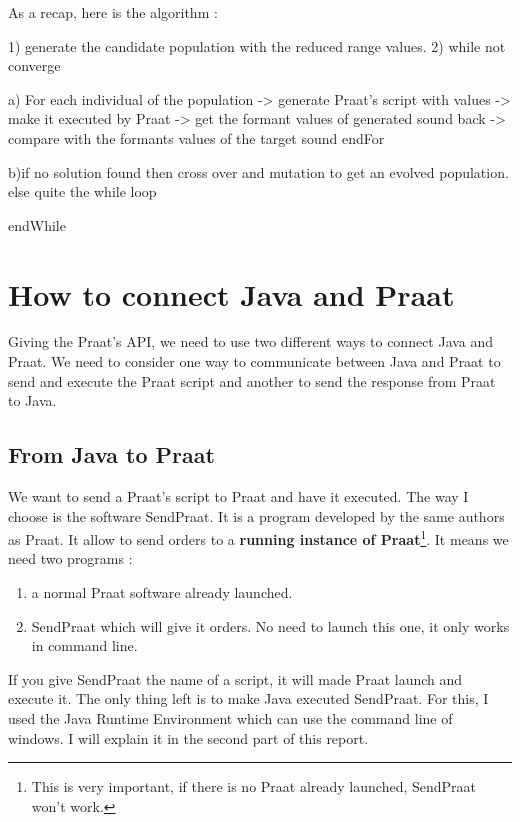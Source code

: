 \documentclass[12pt]{report}
\begin{document}
As a recap, here is the algorithm :


\begin{verbatimtab}[3]
1) generate the candidate population with the reduced range values.
2) while not converge{
		a) For each individual of the population{
					-> generate Praat's script with values 
					-> make it executed by Praat
					-> get the formant values of generated sound back
					-> compare with the formants values of the target sound	   
		   }endFor
		   
		b)if no solution found then{ 
				cross over and mutation to get an evolved population.
			}else{
				 quite the while loop  	 
			}   
		
   }endWhile

\end{verbatimtab}

\chapter{How to connect Java and Praat}
Giving the Praat's API, we need to use two different ways to connect Java and Praat.
We need to consider one way to communicate between Java and Praat to send and execute the Praat script and another to send the response from Praat to Java.

\section{From Java to Praat}
We want to send a Praat's script to Praat and have it executed. The way I choose is the software SendPraat\cite{ref}. It is a program developed by the same authors as Praat. It allow to send orders to a {\bfseries running instance of Praat}\footnote{This is very important, if there is no Praat already launched, SendPraat won't work.}.
It means we need two programs :

\begin{enumerate}
\item a normal Praat software already launched.
\item SendPraat which will give it orders. No need to launch this one, it only works in command line.
\end{enumerate}

If you give SendPraat the name of a script, it will made Praat launch and execute it. The only thing left is to make Java executed SendPraat. For this, I used the Java Runtime Environment which can use the command line of windows. I will explain it in the second part of this report.
\end{document}
